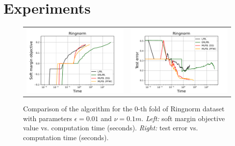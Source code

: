 \section{Experiments}
\label{sec:experiments}
\begin{figure}[t]
    \centering
    \begin{tabular}{cc}
        \begin{minipage}[t]{0.45\hsize}
            \centering
            \includegraphics[keepaspectratio, scale=0.5]{figure/paper_curve.pdf}
        \end{minipage}
        &
        \begin{minipage}[t]{0.45\hsize}
            \centering
            \includegraphics[keepaspectratio, scale=0.5]{figure/paper_test.pdf}
        \end{minipage}
    \end{tabular}
    \caption{%
        Comparison of the algorithm for the 0-th fold of %
        Ringnorm dataset with parameters $\epsilon = 0.01$ %
        and $\nu = 0.1m$. %
        \emph{Left:} %
        soft margin objective value vs. computation time (seconds). %
        \emph{Right:} %
        test error vs. computation time (seconds). %
    }
\end{figure}

